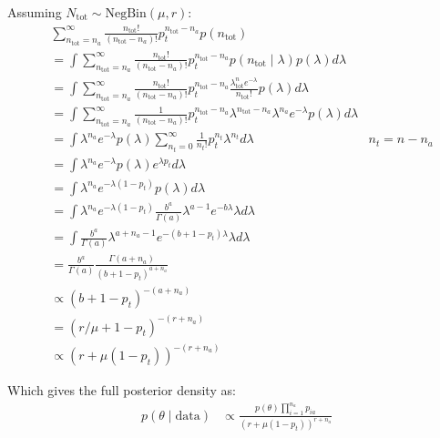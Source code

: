 \documentclass[thesis.tex]{subfiles}
\begin{document}
Assuming $N_\text{tot} \sim \text{NegBin}(\mu, r)$:
\begin{align}
&\sum_{n_\text{tot}=n_a}^\infty \frac{n_\text{tot}!}{(n_\text{tot}-n_a)!} p_t^{n_\text{tot}-n_a} p(n_\text{tot}) \\
&= \int \sum_{n_\text{tot}=n_a}^\infty \frac{n_\text{tot}!}{(n_\text{tot}-n_a)!} p_t^{n_\text{tot}-n_a} p(n_\text{tot} \mid \lambda) p(\lambda) d\lambda \\
&= \int \sum_{n_\text{tot}=n_a}^\infty \frac{n_\text{tot}!}{(n_\text{tot}-n_a)!} p_t^{n_\text{tot}-n_a} \frac{\lambda^n_\text{tot} e^{-\lambda}}{n_\text{tot}!} p(\lambda) d\lambda \\
&= \int \sum_{n_\text{tot}=n_a}^\infty \frac{1}{(n_\text{tot}-n_a)!} p_t^{n_\text{tot}-n_a} \lambda^{n_\text{tot}-n_a} \lambda^{n_a} e^{-\lambda} p(\lambda) d\lambda \\
&= \int \lambda^{n_a} e^{-\lambda} p(\lambda) \sum_{n_t=0}^\infty \frac{1}{n_t!} p_t^{n_t} \lambda^{n_t} d\lambda &n_t = n-n_a\\
&= \int \lambda^{n_a} e^{-\lambda} p(\lambda) e^{\lambda p_t} d\lambda \\
&= \int \lambda^{n_a} e^{-\lambda(1 - p_t)} p(\lambda) d\lambda \\
&= \int \lambda^{n_a} e^{-\lambda(1 - p_t)} \frac{b^a}{\Gamma(a)} \lambda^{a-1} e^{-b\lambda} \lambda d\lambda \\
&= \int \frac{b^a}{\Gamma(a)} \lambda^{a+n_a-1} e^{-(b+1-p_t)\lambda} \lambda d\lambda \\
&= \frac{b^a}{\Gamma(a)} \frac{\Gamma(a+n_a)}{(b+1-p_t)^{a+n_a}} \\
&\propto (b+1-p_t)^{-(a+n_a)} \\
&= (r/\mu + 1 - p_t)^{-(r+n_a)} \\
&\propto(r + \mu (1- p_t))^{-(r+n_a)}
\end{align}

Which gives the full posterior density as:
\begin{align}
p(\theta \mid \text{data})
&\propto \frac{p(\theta) \prod_{i=1}^{n_a} p_{ia}}{(r + \mu(1 - p_t))^{r+n_a}}
\end{align}
\end{document}
